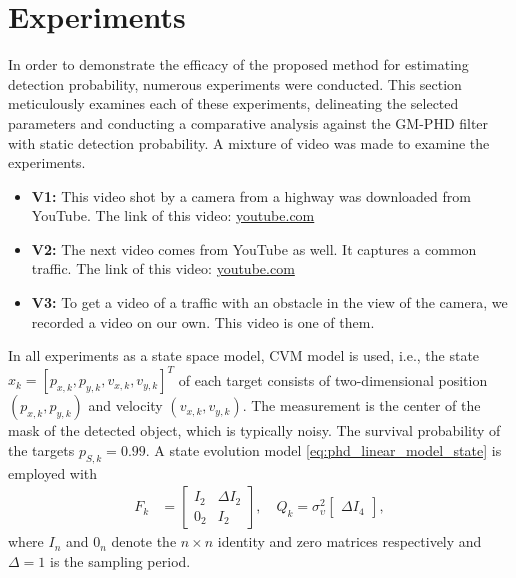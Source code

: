\chapter{Experiments}
In order to demonstrate the efficacy of the proposed method for estimating detection probability, numerous experiments were conducted. This section meticulously examines each of these experiments, delineating the selected parameters and conducting a comparative analysis against the GM-PHD filter with static detection probability.
A mixture of video was made to examine the experiments.
\begin{itemize}
  \item \textbf{V1:} This video shot by a camera from a highway was downloaded from YouTube. The link of this video: \href{https://www.youtube.com/watch?v=KBsqQez-O4w&t=30s&ab_channel=NickMartinez}{youtube.com}
  \item \textbf{V2:} The next video comes from YouTube as well. It captures a common traffic. The link of this video: \href{https://www.youtube.com/watch?v=7WFYiZersNc&ab_channel=AbdulMunaim}{youtube.com}
  \item \textbf{V3:} To get a video of a traffic with an obstacle in the view of the camera, we recorded a video on
  our own. This video is one of them.
\end{itemize}

In all experiments as a state space model, CVM model is used, i.e., the state $x_k = [p_{x,k},p_{y,k},v_{x,k},v_{y,k}]^T$ of each target consists of two-dimensional position $(p_{x,k},p_{y,k})$ and velocity $(v_{x,k},v_{y,k})$. The measurement is the center of the mask of the detected object, which is typically noisy. The survival probability of the targets $p_{S,k} = 0.99$. A state evolution model \eqref{eq:phd_linear_model_state} is employed with
\begin{align}
  F_k &=
  \begin{bmatrix}
    I_2 & \Delta I_2 \\
    0_2 & I_2
  \end{bmatrix},
  \quad
  Q_k = \sigma_{\upsilon}^2
  \begin{bmatrix}
    \Delta I_4
  \end{bmatrix},
\end{align}
where $I_n$ and $0_n$ denote the $n\times n$ identity and zero matrices respectively and $\Delta = 1$ is the sampling
period.


